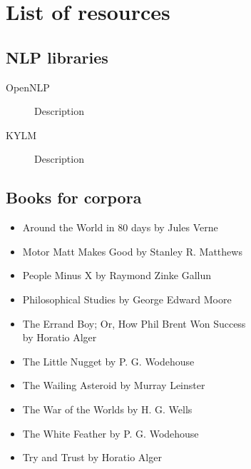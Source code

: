 \section{List of resources}
\subsection*{NLP libraries}
\label{sec:resources}
\begin{description}
\item[OpenNLP]{Description}
\item[KYLM]{Description}
\end{description}
\subsection*{Books for corpora}
\begin{itemize}
	\item{Around the World in 80 days by Jules Verne}
	\item{Motor Matt Makes Good by Stanley R. Matthews}
	\item{People Minus X by Raymond Zinke Gallun}
	\item{Philosophical Studies by George Edward Moore}
	\item{The Errand Boy; Or, How Phil Brent Won Success\\ by Horatio Alger}
	\item{The Little Nugget by P. G. Wodehouse}
	\item{The Wailing Asteroid by Murray Leinster}
	\item{The War of the Worlds by H. G. Wells}
	\item{The White Feather by P. G. Wodehouse}
	\item{Try and Trust by Horatio Alger}
\end{itemize}